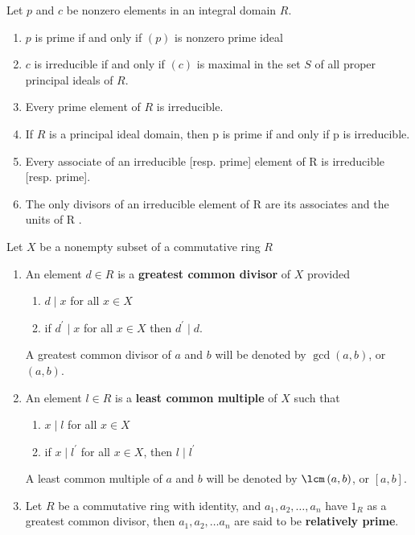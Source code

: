 \begin{theorem}
    Let $p$ and $c$ be nonzero elements in an integral domain $R$.
    \begin{enumerate}
        \item $p$ is prime if and only if $(p)$ is nonzero prime ideal

        \item  $c$ is irreducible if and only if
              $(c)$ is maximal in the set $S$ of all proper principal ideals of $R$.

        \item
              Every prime element of $R$ is irreducible.

        \item
              If $R$ is a principal ideal domain, then p is prime if and only if p is irreducible.
        \item  Every associate of an irreducible [resp. prime] element of R is irreducible [resp. prime].
        \item
              The only divisors of an irreducible element of R are its associates and the units of R .
    \end{enumerate}
\end{theorem}
\begin{definition}
    Let $X$ be a nonempty subset of a commutative ring $R$
    \begin{enumerate}
        \item
              An element $d \in R$ is a \textbf{greatest common divisor} of $X$ provided
              \begin{enumerate}[label=(\roman*)]
                  \item $d \mid x$ for all $x \in X$
                  \item if $d^\prime \mid x$ for all $x \in X$ then $d^{\prime} \mid d$.
              \end{enumerate}
              A greatest common divisor of $a$ and $b$ will be denoted by $\gcd\left(a, b\right)$, or $(a, b)$.
        \item
              An element $l\in R$ is a \textbf{least common multiple} of $X$ such that
              \begin{enumerate}[label=(\roman*)]
                  \item $x\mid l$ for all $x \in X$
                  \item if $x\mid l^\prime$ for all $x \in X$, then $l\mid l^\prime$
              \end{enumerate}
              A least common multiple of $a$ and $b$ will be denoted by $ \lcm \left(a, b\right)$, or $[a, b]$.
        \item
              Let $R$ be a commutative ring with identity, and $a_1, a_2, \ldots, a_n$ have $1_R$ as a greatest common divisor, then $a_1, a_2, \ldots a_n$ are said to be \textbf{relatively prime}.
    \end{enumerate}
\end{definition}
